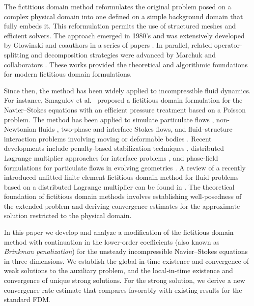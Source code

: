 \documentclass[11pt]{article}
\begin{document}
The fictitious domain method reformulates the original problem posed on a complex physical domain into one defined on a simple background domain that fully embeds  it. This reformulation permits the use of structured meshes and efficient solvers. The approach emerged in 1980's and was extensively developed by Glowinski and coauthors in a series of  papers \cite{Glowinski1994,Glowinski1995,GlowinskiPan2000,Glowinski2001,Girault2001}. In parallel, related operator-splitting and decomposition strategies were advanced by Marchuk and collaborators \cite{Marchuk1986,agoshkov1988poincare}. These works provided the theoretical and algorithmic foundations for modern fictitious domain formulations.

Since then, the method has been widely applied to incompressible fluid dynamics. For instance, Smagulov et al.~\cite{Smagulov2000} proposed a fictitious domain formulation for the Navier--Stokes equations with an efficient pressure treatment based on a Poisson problem. The method has been applied to simulate particulate flows \cite{Wu2020}, non-Newtonian fluids \cite{He2017}, two-phase and interface Stokes flows\cite{Court2019,corti2024low}, and fluid--structure interaction problems involving moving or deformable bodies \cite{boffi2017fictitious,Wang2017,boilevin2019loosely,Wang2019}. Recent developments include penalty-based stabilization techniques \cite{Zhou2018}, distributed Lagrange multiplier approaches for interface problems \cite{WangSun2017}, and phase-field formulations for particulate flows in evolving geometries \cite{Reder2021}. A review of a recently introduced unfitted finite element fictitious domain method for fluid problems based on a distributed Lagrange multiplier  can be found in \cite{alshehri2025advances}.
The theoretical foundation of fictitious domain methods involves establishing well-posedness of the extended problem and deriving convergence estimates for the approximate solution restricted to the physical domain. 

In this paper we develop and analyze a modification of the  fictitious domain method with continuation in the lower-order coefficients (also known as \textit{Brinkman penalization}) for the unsteady incompressible Navier--Stokes equations in three dimensions. We establish the global-in-time existence and convergence of weak solutions to the auxiliary problem, and the local-in-time existence and convergence of unique strong solutions. For the strong solution, we derive a new convergence rate estimate that compares favorably with existing results for the standard FDM.
\end{document}
